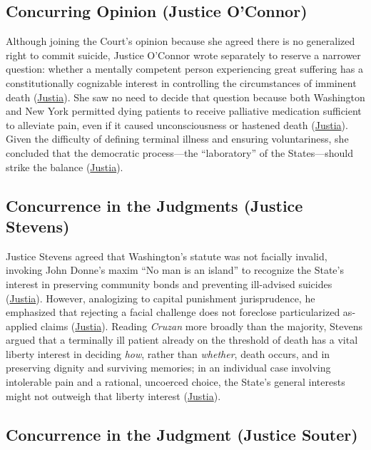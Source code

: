 \documentclass[12pt]{article}
\begin{document}
\subsection{Concurring Opinion (Justice O'Connor)}

Although joining the Court's opinion because she agreed there is no generalized right to commit suicide, Justice O'Connor wrote separately to reserve a narrower question: whether a mentally competent person experiencing great suffering has a constitutionally cognizable interest in controlling the circumstances of imminent death (\href{https://supreme.justia.com/cases/federal/us/521/702/}{Justia}). She saw no need to decide that question because both Washington and New York permitted dying patients to receive palliative medication sufficient to alleviate pain, even if it caused unconsciousness or hastened death (\href{https://supreme.justia.com/cases/federal/us/521/702/}{Justia}). Given the difficulty of defining terminal illness and ensuring voluntariness, she concluded that the democratic process---the ``laboratory'' of the States---should strike the balance (\href{https://supreme.justia.com/cases/federal/us/521/702/}{Justia}).

\subsection{Concurrence in the Judgments (Justice Stevens)}

Justice Stevens agreed that Washington's statute was not facially invalid, invoking John Donne's maxim ``No man is an island'' to recognize the State's interest in preserving community bonds and preventing ill-advised suicides (\href{https://supreme.justia.com/cases/federal/us/521/702/}{Justia}). However, analogizing to capital punishment jurisprudence, he emphasized that rejecting a facial challenge does not foreclose particularized as-applied claims (\href{https://supreme.justia.com/cases/federal/us/521/702/}{Justia}). Reading \textit{Cruzan} more broadly than the majority, Stevens argued that a terminally ill patient already on the threshold of death has a vital liberty interest in deciding \textit{how}, rather than \textit{whether}, death occurs, and in preserving dignity and surviving memories; in an individual case involving intolerable pain and a rational, uncoerced choice, the State's general interests might not outweigh that liberty interest (\href{https://supreme.justia.com/cases/federal/us/521/702/}{Justia}).

\subsection{Concurrence in the Judgment (Justice Souter)}
\end{document}
